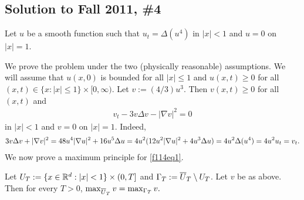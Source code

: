 \subsection*{Solution to Fall 2011, \#4}
\label{F11Q4}

Let $u$ be a smooth function such that $u_{t} = \Delta(u^{4})$ in $|x| < 1$ and $u = 0$ on $|x| = 1$.

We prove the problem under the two (physically reasonable) assumptions. We will assume that $u(x, 0)$ is bounded for all $|x| \leq 1$
and $u(x, t) \geq 0$ for all $(x, t) \in \{x: |x| \leq 1\} \times [0, \infty)$.
Let $v := (4/3)u^{3}$. Then $v(x, t) \geq 0$ for all $(x, t)$ and
\begin{align}\label{f114eq1}
v_{t} - 3v\Delta v - |\nabla v|^{2} = 0
\end{align}
in $|x| < 1$ and $v = 0$ on $|x| = 1$. Indeed,
\begin{align*}
3v\Delta v + |\nabla v|^{2} = 48 u^{4}|\nabla u|^{2} + 16u^{5}\Delta u = 4u^{2}(12 u^{2}|\nabla u|^{2} + 4u^{3} \Delta u) = 4u^{2}\Delta(u^{4}) = 4u^{2}u_{t} = v_{t}.
\end{align*}
We now prove a maximum principle for \eqref{f114eq1}.
\begin{lemma}\label{F11Q4lem1}
Let $U_{T} := \{x \in \mathbb{R}^{d}: |x| < 1\} \times (0, T]$ and $\Gamma_{T} := \overline{U}_{T} \setminus U_{T}$.
Let $v$ be as above. Then for every $T > 0$, $\max_{\overline{U}_{T}}v = \max_{\Gamma_{T}}v.$
\end{lemma}
